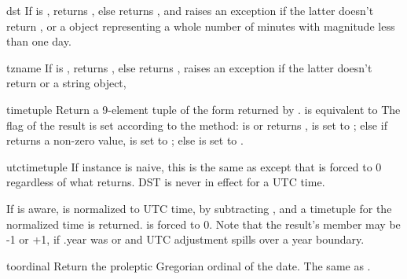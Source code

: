 \begin{methoddesc}{dst}{}
  If  is , returns , else
  returns , and
  raises an exception if the latter doesn't return , or
  a  object representing a whole number of minutes
  with magnitude less than one day.
\end{methoddesc}

\begin{methoddesc}{tzname}{}
  If  is , returns , else
  returns ,
  raises an exception if the latter doesn't return  or
  a string object,
\end{methoddesc}

\begin{methoddesc}{timetuple}{}
  Return a 9-element tuple of the form returned by
  .
   is equivalent to
  The  flag of the result is set according to
  the  method:   is  or
   returns ,
   is set to  ; else if  returns
  a non-zero value,  is set to ;
  else  is set to .
\end{methoddesc}

\begin{methoddesc}{utctimetuple}{}
  If  instance  is naive, this is the same as
   except that  is forced to 0
  regardless of what  returns.  DST is never in effect
  for a UTC time.

  If  is aware,  is normalized to UTC time, by subtracting
  , and a timetuple for the
  normalized time is returned.   is forced to 0.
  Note that the result's  member may be
  -1 or +1, if .year was
   or  and UTC adjustment spills over a
  year boundary.
\end{methoddesc}

\begin{methoddesc}{toordinal}{}
  Return the proleptic Gregorian ordinal of the date.  The same as
  .
\end{methoddesc}

